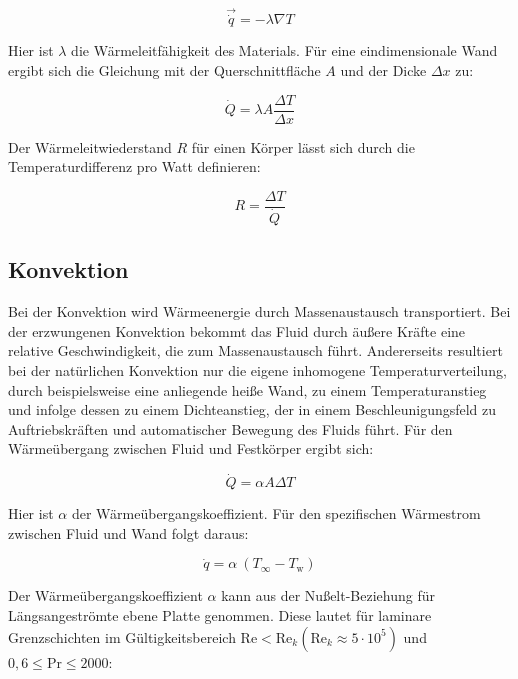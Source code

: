 \begin{equation}
  \label{eq:fourier}
  \vec{\dot{q}} = -\lambda \nabla T
\end{equation}

Hier ist $\lambda$ die Wärmeleitfähigkeit des Materials.
Für eine eindimensionale Wand ergibt sich die Gleichung mit der Querschnittfläche $A$ und der Dicke $\Delta x$ zu:

\begin{equation}
  \label{eq:fourier_1d}
  \dot{Q} = \lambda A \frac{\Delta T}{\Delta x}
\end{equation}

Der Wärmeleitwiederstand $R$ für einen Körper lässt sich durch die Temperaturdifferenz pro Watt definieren:

\begin{equation}
  \label{eq:waermewiederstand}
  R = \frac{\Delta T}{\dot{Q}}
\end{equation}

\subsection{Konvektion}\label{sec:konvektion}

Bei der Konvektion wird Wärmeenergie durch Massenaustausch transportiert. Bei der erzwungenen Konvektion bekommt das Fluid durch äußere Kräfte
eine relative Geschwindigkeit, die zum Massenaustausch führt. Andererseits resultiert bei der natürlichen Konvektion nur die eigene
inhomogene Temperaturverteilung, durch beispielsweise eine anliegende heiße Wand, zu einem Temperaturanstieg und infolge dessen zu einem
Dichteanstieg, der in einem Beschleunigungsfeld zu Auftriebskräften und automatischer Bewegung des Fluids führt.
Für den Wärmeübergang zwischen Fluid und Festkörper ergibt sich:

\begin{equation}
    \dot{Q}=\alpha A \Delta T 
\end{equation}

Hier ist $\alpha$ der Wärmeübergangskoeffizient.
Für den spezifischen Wärmestrom zwischen Fluid und Wand folgt daraus:

\begin{equation}
  \label{eq:qdot_freestream}
  \dot{q} = \alpha \ (T_{\infty} - T_\text{w})
\end{equation}

Der Wärmeübergangskoeffizient $\alpha$ kann aus der Nußelt-Beziehung für Längsangeströmte ebene Platte genommen. Diese lautet
für laminare Grenzschichten im Gültigkeitsbereich $\text{Re} < \text{Re}_k \left(\text{Re}_k \approx 5 \cdot 10^5\right)$ und $0,6 \leq \text{Pr} \leq 2000$:

